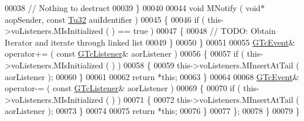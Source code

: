 \begin{DoxyCode}
00038             \textcolor{comment}{// Nothing to destruct}
00039          \}
00040 
00044          \textcolor{keywordtype}{void} MNotify ( \textcolor{keywordtype}{void}* aopSender, \textcolor{keyword}{const} \mbox{\hyperlink{namespace_g_n_common_a941b527ef318f318aed7903dc832b7e4}{Tu32}} auiIdentifier )
00045          \{
00046             \textcolor{keywordflow}{if} ( this->voListeners.MIsInitialized ( ) == true )
00047             \{
00048                \textcolor{comment}{// TODO: Obtain Iterator and iterate through linked list}
00049             \}
00050          \}
00051 
00055          \mbox{\hyperlink{class_g_n_common_1_1_n_component_1_1_g_tc_event}{GTcEvent}}& operator+= ( \textcolor{keyword}{const} \mbox{\hyperlink{class_g_n_common_1_1_n_component_1_1_g_tc_listener}{GTcListener}}& aorListener )
00056          \{
00057             \textcolor{keywordflow}{if} ( this->voListeners.MIsInitialized ( ) )
00058             \{
00059                this->voListeners.MInsertAtTail ( aorListener );
00060             \}
00061 
00062             \textcolor{keywordflow}{return} *\textcolor{keyword}{this};
00063          \}
00064 
00068          \mbox{\hyperlink{class_g_n_common_1_1_n_component_1_1_g_tc_event}{GTcEvent}}& operator-= ( \textcolor{keyword}{const} \mbox{\hyperlink{class_g_n_common_1_1_n_component_1_1_g_tc_listener}{GTcListener}}& aorListener )
00069          \{
00070             \textcolor{keywordflow}{if} ( this->voListeners.MIsInitialized ( ) )
00071             \{
00072                this->voListeners.MInsertAtTail ( aorListener );
00073             \}
00074 
00075             \textcolor{keywordflow}{return} *\textcolor{keyword}{this};
00076          \}
00077       \};
00078    \}
00079 \}
\end{DoxyCode}
